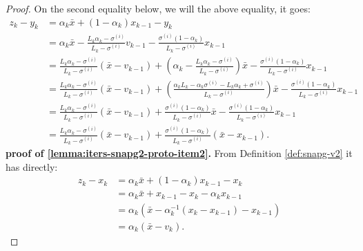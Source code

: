 \documentclass[12pt]{article}
\begin{document}
\begin{proof}
        On the second equality below, we will the above equality, it goes: 
        \begin{align*}
            z_k - y_k &= 
            \alpha_k \bar x + (1 - \alpha_k)x_{k - 1} - y_k
            \\
            &= \alpha_k \bar x 
            - \frac{L_k\alpha_k - \sigma^{(i)}}{L_k - \sigma^{(i)}} v_{k - 1} 
            - \frac{\sigma^{(i)}(1 - \alpha_k)}{L_k - \sigma^{(i)}} x_{k - 1}
            \\
            &= \frac{L_k\alpha_k - \sigma^{(i)}}{L_k - \sigma^{(i)}}(\bar x - v_{k - 1})
            + \left(
                \alpha_k - \frac{L_k\alpha_k - \sigma^{(i)}}{L_k - \sigma^{(i)}}
            \right)\bar x
            - \frac{\sigma^{(i)}(1 - \alpha_k)}{L_k - \sigma^{(i)}} x_{k - 1}
            \\
            &= \frac{L_k\alpha_k - \sigma^{(i)}}{L_k - \sigma^{(i)}}(\bar x - v_{k - 1})
            + \left(
                \frac{\alpha_kL_k - \alpha_k \sigma^{(i)} - L_k\alpha_k + \sigma^{(i)}}{L_k - \sigma^{(i)}}
            \right)\bar x
            - \frac{\sigma^{(i)}(1 - \alpha_k)}{L_k - \sigma^{(i)}} x_{k - 1}
            \\
            &= \frac{L_k\alpha_k - \sigma^{(i)}}{L_k - \sigma^{(i)}}(\bar x - v_{k - 1})
            + \frac{\sigma^{(i)}(1 - \alpha_k)}{L_k - \sigma^{(i)}}\bar x
            - \frac{\sigma^{(i)}(1 - \alpha_k)}{L_k - \sigma^{(i)}} x_{k - 1}
            \\
            &= \frac{L_k\alpha_k - \sigma^{(i)}}{L_k - \sigma^{(i)}}(\bar x - v_{k - 1})
            + \frac{\sigma^{(i)}(1 - \alpha_k)}{L_k - \sigma^{(i)}}(\bar x - x_{k - 1}).
        \end{align*}
        \textbf{proof of \ref{lemma:iters-snapg2-proto-item2}.}
        From Definition \ref{def:snapg-v2} it has directly: 
        \begin{align*}
            z_k - x_k &= \alpha_k \bar x + (1 - \alpha_k)x_{k - 1} - x_k
            \\
            &= \alpha_k \bar x + x_{k - 1} - x_k - \alpha_k x_{k - 1}
            \\
            &= \alpha_k(\bar x - \alpha_k^{-1}(x_k - x_{k - 1}) - x_{k - 1})
            \\
            &= \alpha_k (\bar x - v_k).
        \end{align*}

    \end{proof}
\end{document}
